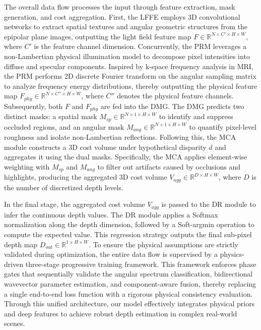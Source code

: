 \documentclass[lettersize,journal]{IEEEtran}
\begin{document}
The overall data flow processes the input through feature extraction, mask generation, and cost aggregation. First, the LFFE employs 3D convolutional networks to extract spatial textures and angular geometric structures from the epipolar plane images, outputting the light field feature map $F \in \mathbb{R}^{N \times C' \times H \times W}$, where $C'$ is the feature channel dimension. Concurrently, the PRM leverages a non-Lambertian physical illumination model to decompose pixel intensities into diffuse and specular components. Inspired by k-space frequency analysis in MRI, the PRM performs 2D discrete Fourier transform on the angular sampling matrix to analyze frequency energy distributions, thereby outputting the physical feature map $F_{phy} \in \mathbb{R}^{N \times C'' \times H \times W}$, where $C''$ denotes the physical feature channels. Subsequently, both $F$ and $F_{phy}$ are fed into the DMG. The DMG predicts two distinct masks: a spatial mask $M_{sp} \in \mathbb{R}^{N \times 1 \times H \times W}$ to identify and suppress occluded regions, and an angular mask $M_{ang} \in \mathbb{R}^{N \times 1 \times H \times W}$ to quantify pixel-level roughness and isolate non-Lambertian reflections. Following this, the MCA module constructs a 3D cost volume under hypothetical disparity $d$ and aggregates it using the dual masks. Specifically, the MCA applies element-wise weighting with $M_{sp}$ and $M_{ang}$ to filter out artifacts caused by occlusions and highlights, producing the aggregated 3D cost volume $V_{agg} \in \mathbb{R}^{D \times H \times W}$, where $D$ is the number of discretized depth levels.

In the final stage, the aggregated cost volume $V_{agg}$ is passed to the DR module to infer the continuous depth values. The DR module applies a Softmax normalization along the depth dimension, followed by a Soft-argmin operation to compute the expected value. This regression strategy outputs the final sub-pixel depth map $D_{out} \in \mathbb{R}^{1 \times H \times W}$. To ensure the physical assumptions are strictly validated during optimization, the entire data flow is supervised by a physics-driven three-stage progressive training framework. This framework enforces phase gates that sequentially validate the angular spectrum classification, bidirectional wavevector parameter estimation, and component-aware fusion, thereby replacing a single end-to-end loss function with a rigorous physical consistency evaluation. Through this unified architecture, our model effectively integrates physical priors and deep features to achieve robust depth estimation in complex real-world scenes.
\end{document}
